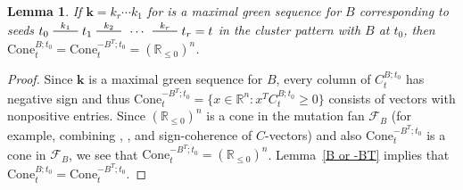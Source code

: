 \documentclass{amsart}
\newtheorem{lemma}[proposition]{Lemma}
\theoremstyle{definition}
\theoremstyle{remark}
\numberwithin{equation}{section}
\newcommand{\reals}{\mathbb R}
\newcommand{\edge}{\,\,\rule[2.7pt]{20pt}{0.5pt}\,\,}
\newcommand{\set}[1]{{\lbrace #1 \rbrace}}
\newcommand{\F}{{\mathcal F}}
\newcommand{\0}{{\mathbf{0}}}
\newcommand{\Cone}{\mathrm{Cone}}
\newcommand{\kk}{{\boldsymbol{k}}}
\begin{document}
\begin{lemma}\label{max green neg cone}
If $\kk=k_r\cdots k_1$ for is a maximal green sequence for $B$ corresponding to seeds $t_0\overset{k_1}{\edge}t_1\overset{k_2}{\edge}\,\cdots\,\overset{k_r}{\edge}t_r=t$ in the cluster pattern with $B$ at $t_0$, then ${\Cone_t^{B;t_0}=\Cone_t^{-B^T;t_0}=\left(\reals_{\le0}\right)^n}$.
\end{lemma}
\begin{proof}
Since $\kk$ is a maximal green sequence for $B$, every column of $C_t^{B;t_0}$ has negative sign and thus $\Cone_t^{-B^T;t_0}=\set{x\in\reals^n:x^TC_t^{B;t_0}\ge0}$ consists of vectors with nonpositive entries.
Since $\left(\reals_{\le0}\right)^n$ is a cone in the mutation fan $\F_B$ (for example, combining \mbox{\cite[Proposition~7.1]{universal}}, \mbox{\cite[Proposition~8.9]{universal}}, and sign-coherence of $C$-vectors) and also $\Cone_t^{-B^T;t_0}$ is a cone in $\F_B$, we see that $\Cone_t^{-B^T;t_0}=\left(\reals_{\le0}\right)^n$.
Lemma~\ref{B or -BT} implies that $\Cone_t^{B;t_0}=\Cone_t^{-B^T;t_0}$.
\end{proof}
\end{document}
